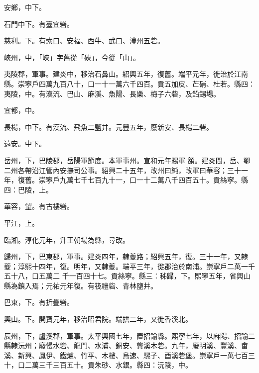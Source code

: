 \begin{pinyinscope}
 安鄉，中下。



 石門中下。有臺宜砦。



 慈利。下。有索口、安福、西牛、武口、澧州五砦。



 峽州，中，「峽」字舊從「硤」，今從「山」。



 夷陵郡，軍事。建炎中，移治石鼻山。紹興五年，復舊。端平元年，徙治於江南縣。崇寧戶四萬九百八十，口一十一萬六千四百。貢五加皮、芒硝、杜若。縣四：夷陵，中。有漢流、巴山、麻溪、魚陽、長樂、梅子六砦，及鉛錫場。



 宜都，中。



 長楊，中下。有漢流、飛魚二鹽井。元豐五年，廢新安、長楊二砦。



 遠安。中下。



 岳州，下，巴陵郡，岳陽軍節度。本軍事州。宣和元年賜軍
 額。建炎間，岳、鄂二州各帶沿江管內安撫司公事。紹興二十五年，改州曰純，改軍曰華容；三十一年，復舊。崇寧戶九萬七千七百九十一，口一十二萬八千四百五十。貢絲寧。縣四：巴陵，上。



 華容，望。有古樓砦。



 平江，上。



 臨湘。淳化元年，升王朝場為縣，尋改。



 歸州，下，巴東郡，軍事。建炎四年，隸夔路；紹興五年，復。三十一年，又隸夔；淳熙十四年，復。明年，又隸夔。端平三年，徙郡治於南浦。崇寧戶二萬一千五十八，口五萬二
 千一百四十七。貢絲寧。縣三：秭歸，下。熙寧五年，省興山縣為鎮入焉；元祐元年復。有筏禮砦、青林鹽井。



 巴東，下。有折疊砦。



 興山。下。開寶元年，移治昭君院。端拱二年，又徙香溪北。



 辰州，下，盧溪郡，軍事。太平興國七年，置招諭縣。熙寧七年，以麻陽、招諭二縣隸沅州；廢慢水砦、龍門、水浦、銅安、龔溪木砦。九年，廢明溪、豐溪、畬溪、新興、鳳伊、鐵爐、竹平、木樓、烏速、騾子、酉溪砦堡。崇寧戶一萬七百三十，口二萬三千三百五十。貢朱砂、水銀。縣四：沅陵，中。




\end{pinyinscope}
